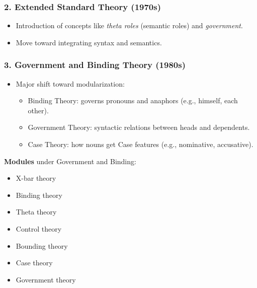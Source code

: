 \documentclass[12pt]{article}
\newcommand{\tightlist}{\itemsep 0pt\parskip 0pt\parsep 0pt}
\begin{document}
\hypertarget{extended-standard-theory-1970s}{%
\subsubsection{\texorpdfstring{2. \textbf{Extended Standard Theory
(1970s)}}{2. Extended Standard Theory (1970s)}}\label{extended-standard-theory-1970s}}

\begin{itemize}
\tightlist
\item
  Introduction of concepts like \emph{theta roles} (semantic roles) and
  \emph{government}.
\item
  Move toward integrating syntax and semantics.
\end{itemize}

\hypertarget{government-and-binding-theory-1980s}{%
\subsubsection{\texorpdfstring{3. \textbf{Government and Binding Theory
(1980s)}}{3. Government and Binding Theory (1980s)}}\label{government-and-binding-theory-1980s}}

\begin{itemize}
\tightlist
\item
  Major shift toward modularization:

  \begin{itemize}
  \tightlist
  \item
    Binding Theory: governs pronouns and anaphors (e.g., himself, each
    other).
  \item
    Government Theory: syntactic relations between heads and dependents.
  \item
    Case Theory: how nouns get Case features (e.g., nominative,
    accusative).
  \end{itemize}
\end{itemize}

\textbf{Modules} under Government and Binding:

\begin{itemize}
\tightlist
\item
  X-bar theory
\item
  Binding theory
\item
  Theta theory
\item
  Control theory
\item
  Bounding theory
\item
  Case theory
\item
  Government theory
\end{itemize}
\end{document}

